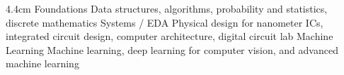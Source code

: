 


\begin{cvsides}{4.4cm}
  \cvside
    {Foundations}
    {Data structures, algorithms, probability and statistics, discrete mathematics}
  \cvside
    {Systems / EDA}
    {Physical design for nanometer ICs, integrated circuit design, computer architecture, digital circuit lab}
  \cvside
    {Machine Learning}
      {Machine learning, deep learning for computer vision, and advanced machine learning}
\end{cvsides}

